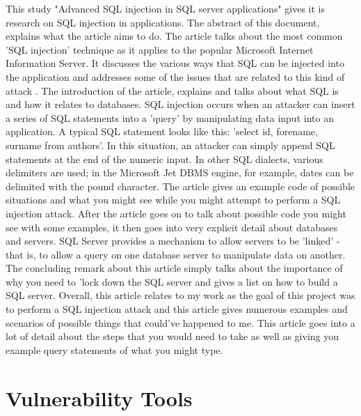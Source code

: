 This study "Advanced SQL injection in SQL server applications" gives it is research on SQL injection in applications. The abstract of this document, explains what the article aims to do. The article talks about the most common 'SQL injection' technique as it applies to the popular Microsoft Internet Information Server. It discusses the various ways that SQL can be injected into the application and addresses some of the issues that are related to this kind of attack \cite{anley2002advanced}.
The introduction of the article, explains and talks about what SQL is and how it relates to databases. SQL injection occurs when an attacker can insert a series of SQL statements into a 'query' by manipulating data input into an application. A typical SQL statement looks like this:
'select id, forename, surname from authors'. In this situation, an attacker can simply append SQL statements at the end of the numeric input. In other SQL dialects, various delimiters are used; in the Microsoft Jet DBMS engine, for example, dates can be delimited with the pound character. The article gives an example code of possible situations and what you might see while you might attempt to perform a SQL injection attack. After the article goes on to talk about possible code you might see with some examples, it then goes into very explicit detail about databases and servers. SQL Server provides a mechanism to allow servers to be 'linked' - that is, to allow a query on one database server to manipulate data on another. The concluding remark about this article simply talks about the importance of why you need to 'lock down the SQL server and gives a list on how to build a SQL server. Overall, this article relates to my work as the goal of this project was to perform a SQL injection attack and this article gives numerous examples and scenarios of possible things that could've happened to me. This article goes into a lot of detail about the steps that you would need to take as well as giving you example query statements of what you might type.



\section{Vulnerability Tools}
\label{sec:Vulnerability Tools}

